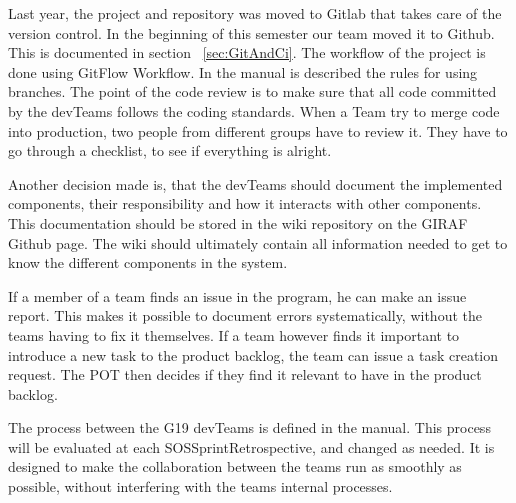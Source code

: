 Last year, the project and repository was moved to Gitlab that takes care of the version control. In the beginning of this semester our team moved it to Github. This is documented in section ~\ref{sec:GitAndCi}. The workflow of the project is done using GitFlow Workflow. In the manual is described the rules for using branches. 
The point of the code review is to make sure that all code committed by the \glspl{devTeam} follows the coding standards. When a Team try to merge code into production, two people from different groups have to review it. They have to go through a checklist, to see if everything is alright. 

Another decision made is, that the \glspl{devTeam} should document the implemented components, their responsibility and how it interacts with other components. This documentation should be stored in the wiki repository on the GIRAF Github page. The wiki should ultimately contain all information needed to get to know the different components in the system.  

If a member of a team finds an issue in the program, he can make an issue report. This makes it possible to document errors systematically, without the \glspl{team} having to fix it themselves. If a \gls{team} however finds it important to introduce a new task to the product backlog, the team can issue a task creation request. The \gls{POT} then decides if they find it relevant to have in the product backlog. 

The process between the \gls{G19} \glspl{devTeam} is defined in the manual. This process will be evaluated at each \gls{SOSSprintRetrospective}, and changed as needed. It is designed to make the collaboration between the \glspl{team} run as smoothly as possible, without interfering with the \glspl{team} internal processes.  
